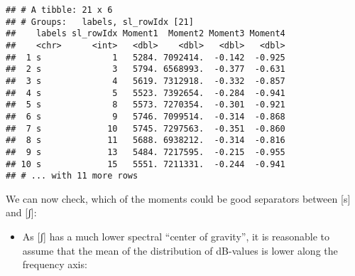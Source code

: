 \documentclass[
]{book}
\newenvironment{Shaded}{\begin{snugshade}}{\end{snugshade}}
\newcommand{\AttributeTok}[1]{\textcolor[rgb]{0.77,0.63,0.00}{#1}}
\newcommand{\ConstantTok}[1]{\textcolor[rgb]{0.00,0.00,0.00}{#1}}
\newcommand{\DecValTok}[1]{\textcolor[rgb]{0.00,0.00,0.81}{#1}}
\newcommand{\FunctionTok}[1]{\textcolor[rgb]{0.00,0.00,0.00}{#1}}
\newcommand{\NormalTok}[1]{#1}
\newcommand{\OtherTok}[1]{\textcolor[rgb]{0.56,0.35,0.01}{#1}}
\newcommand{\SpecialCharTok}[1]{\textcolor[rgb]{0.00,0.00,0.00}{#1}}
\newcommand{\StringTok}[1]{\textcolor[rgb]{0.31,0.60,0.02}{#1}}
\providecommand{\tightlist}{%
  \setlength{\itemsep}{0pt}\setlength{\parskip}{0pt}}
\begin{document}
\begin{Shaded}
\end{Shaded}

\begin{verbatim}
## # A tibble: 21 x 6
## # Groups:   labels, sl_rowIdx [21]
##    labels sl_rowIdx Moment1  Moment2 Moment3 Moment4
##    <chr>      <int>   <dbl>    <dbl>   <dbl>   <dbl>
##  1 s              1   5284. 7092414.  -0.142  -0.925
##  2 s              3   5794. 6568993.  -0.377  -0.631
##  3 s              4   5619. 7312918.  -0.332  -0.857
##  4 s              5   5523. 7392654.  -0.284  -0.941
##  5 s              8   5573. 7270354.  -0.301  -0.921
##  6 s              9   5746. 7099514.  -0.314  -0.868
##  7 s             10   5745. 7297563.  -0.351  -0.860
##  8 s             11   5688. 6938212.  -0.314  -0.816
##  9 s             13   5484. 7217595.  -0.215  -0.955
## 10 s             15   5551. 7211331.  -0.244  -0.941
## # ... with 11 more rows
\end{verbatim}

We can now check, which of the moments could be good separators between {[}s{]} and {[}ʃ{]}:

\begin{itemize}
\tightlist
\item
  As {[}ʃ{]} has a much lower spectral ``center of gravity'', it is reasonable to assume that the mean of the distribution of dB-values is lower along the frequency axis:
\end{itemize}
\end{document}
